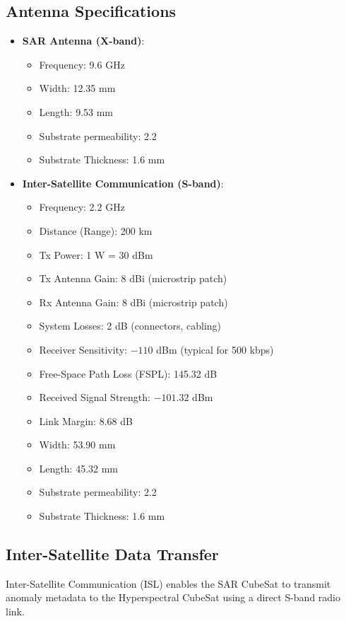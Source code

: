 \documentclass[12pt]{article}
\begin{document}
\subsection{Antenna Specifications}
\begin{itemize}
    \item \textbf{SAR Antenna (X-band)}:
    \begin{itemize}
        \item Frequency: 9.6 GHz
        \item Width: 12.35 mm
        \item Length: 9.53 mm
        \item Substrate permeability: 2.2
        \item Substrate Thickness: 1.6 mm
    \end{itemize}
    \item \textbf{Inter-Satellite Communication (S-band)}:
    \begin{itemize}
        \item Frequency: 2.2 GHz
        \item Distance (Range): 200 km
        \item Tx Power: 1 W = 30 dBm
        \item Tx Antenna Gain: 8 dBi (microstrip patch)
        \item Rx Antenna Gain: 8 dBi (microstrip patch)
        \item System Losses: 2 dB (connectors, cabling)
        \item Receiver Sensitivity: $-110$ dBm (typical for 500 kbps)
        \item Free-Space Path Loss (FSPL): 145.32 dB
        \item Received Signal Strength: $-101.32$ dBm
        \item Link Margin: 8.68 dB
        \item Width: 53.90 mm
        \item Length: 45.32 mm
        \item Substrate permeability: 2.2
        \item Substrate Thickness: 1.6 mm
    \end{itemize}
\end{itemize}

\subsection{Inter-Satellite Data Transfer}
Inter-Satellite Communication (ISL) enables the SAR CubeSat to transmit anomaly metadata to the Hyperspectral CubeSat using a direct S-band radio link.
\end{document}
